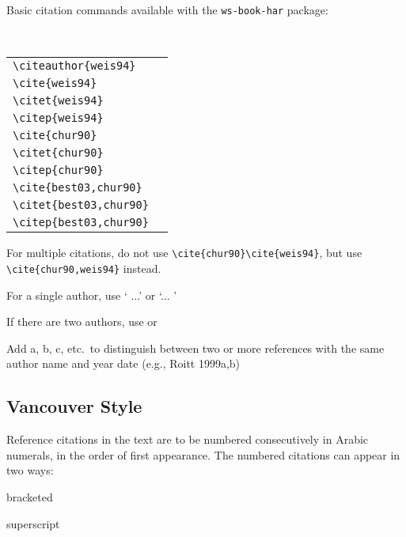 Basic citation commands available with the \verb|ws-book-har| package:

\

{\tablefont
\begin{tabular}{l@{\quad$\Rightarrow$\quad}l}
\verb|\citeauthor{weis94}|  & \citeauthor{weis94}\\
\verb|\cite{weis94}|  & \cite{weis94}\\
\verb|\citet{weis94}| & \citet{weis94}\\
\verb|\citep{weis94}| & \citep{weis94}\\
\verb|\cite{chur90}| & \cite{chur90}\\
\verb|\citet{chur90}| & \citet{chur90}\\
\verb|\citep{chur90}| & \citep{chur90}\\
\verb|\cite{best03,chur90}| & \cite{best03,chur90}\\
\verb|\citet{best03,chur90}| & \citet{best03,chur90}\\
\verb|\citep{best03,chur90}| & \citep{best03,chur90}\\
\end{tabular}}

\begin{itemlist}
\item For multiple citations, do not use \verb|\cite{chur90}\cite{weis94}|, but use
\verb|\cite{chur90,weis94}| instead.
\item For a single author, use `\citet{weis94} ...' or
`... \cite{weis94}'
\item If there are two authors, use \cite{chur90} or \citep{chur90}
\item Add a, b, c, etc.~to distinguish between two or
more references with the same author name and year date (e.g., Roitt
1999a,b)
\end{itemlist}

\subsection{Vancouver Style}

Reference citations in the text are to be numbered consecutively in
Arabic numerals, in the order of first appearance. The numbered citations
can appear in two ways:

\begin{romanlist}[(ii)]
\item bracketed
\item superscript
\end{romanlist}


